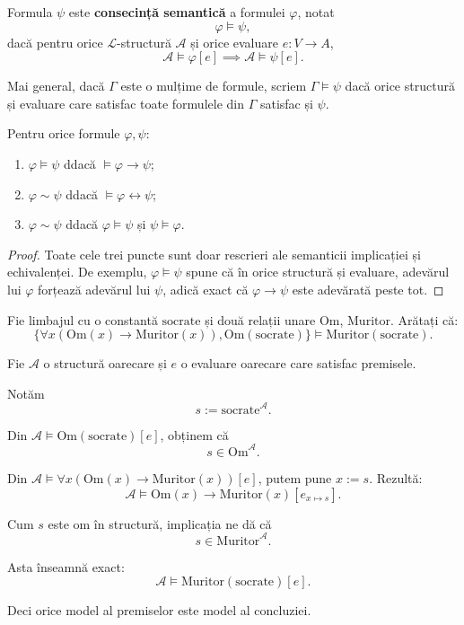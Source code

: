 \begin{definition}
	Formula \( \psi \) este \textbf{consecință semantică} a formulei \( \varphi \), notat
	\[
		\varphi \models \psi,
	\]
	dacă pentru orice \( \mathcal{L} \)-structură \( \mathcal{A} \) și orice evaluare \(e : V \to A\),
	\[
		\mathcal{A} \models \varphi[e] \implies \mathcal{A} \models \psi[e].
	\]
\end{definition}

Mai general, dacă \( \Gamma \) este o mulțime de formule, scriem \( \Gamma \models \psi \) dacă orice structură și evaluare care satisfac toate formulele din
\( \Gamma \) satisfac și \( \psi \).

\begin{prop}
	Pentru orice formule \( \varphi, \psi \):
	\begin{enumerate}
		\item \( \varphi \models \psi \) ddacă \( \models \varphi \to \psi \);
		\item \( \varphi \sim \psi \) ddacă \( \models \varphi \leftrightarrow \psi \);
		\item \( \varphi \sim \psi \) ddacă \( \varphi \models \psi \) și \( \psi \models \varphi \).
	\end{enumerate}
\end{prop}

\begin{proof}
	Toate cele trei puncte sunt doar rescrieri ale semanticii implicației și echivalenței. De exemplu, \( \varphi \models \psi \) spune că în orice structură și evaluare,
	adevărul lui \( \varphi \) forțează adevărul lui \( \psi \), adică exact că \( \varphi \to \psi \) este adevărată peste tot.
\end{proof}

\begin{ex}
	Fie limbajul cu o constantă \( \mathrm{socrate} \) și două relații unare \( \mathrm{Om} \), \( \mathrm{Muritor} \).
	Arătați că:
	\[
		\{\forall x(\mathrm{Om}(x) \to \mathrm{Muritor}(x)), \mathrm{Om}(\mathrm{socrate})\}
		\models
		\mathrm{Muritor}(\mathrm{socrate}).
	\]
\end{ex}

\begin{solutie}
	Fie \( \mathcal{A} \) o structură oarecare și \(e\) o evaluare oarecare care satisfac premisele.

	Notăm
	\[
		s := \mathrm{socrate}^{\mathcal{A}}.
	\]

	Din \( \mathcal{A} \models \mathrm{Om}(\mathrm{socrate})[e] \), obținem că
	\[
		s \in \mathrm{Om}^{\mathcal{A}}.
	\]

	Din \( \mathcal{A} \models \forall x(\mathrm{Om}(x) \to \mathrm{Muritor}(x))[e] \), putem pune \(x := s\). Rezultă:
	\[
		\mathcal{A} \models \mathrm{Om}(x) \to \mathrm{Muritor}(x)[e_{x \mapsto s}].
	\]

	Cum \(s\) este om în structură, implicația ne dă că
	\[
		s \in \mathrm{Muritor}^{\mathcal{A}}.
	\]

	Asta înseamnă exact:
	\[
		\mathcal{A} \models \mathrm{Muritor}(\mathrm{socrate})[e].
	\]

	Deci orice model al premiselor este model al concluziei.
\end{solutie}

